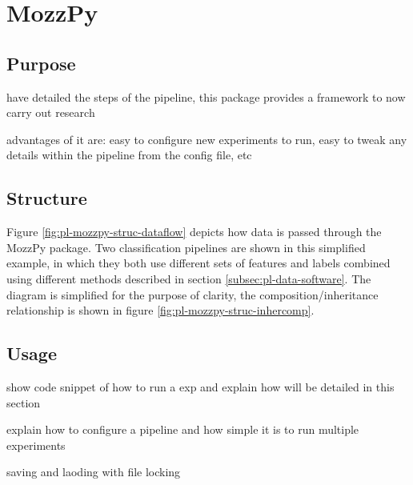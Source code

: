 \section{MozzPy}
\label{sec:pl-mozzpy}
    \subsection{Purpose}
    \label{subsec:pl-mozzpy-purp}
        \begin{sitemize}
            \item{have detailed the steps of the pipeline, this package provides a framework to now carry out research}
            \item{advantages of it are: easy to configure new experiments to run, easy to tweak any details within the pipeline from the config file, etc}
        \end{sitemize}
    
    \subsection{Structure}
    \label{subsec:pl-mozzpy-struc}
        
        Figure \ref{fig:pl-mozzpy-struc-dataflow} depicts how data is passed through the MozzPy package. Two classification pipelines are shown in this simplified example, in which they both use different sets of features and labels combined using different methods described in section \ref{subsec:pl-data-software}. The diagram is simplified for the purpose of clarity, the composition/inheritance relationship is shown in figure \ref{fig:pl-mozzpy-struc-inhercomp}.
        
        
        
  
        
    
    \subsection{Usage}
    \label{subsec:pl-mozzpy-usage}
        \begin{sitemize}
            \item{show code snippet of how to run a exp and explain how will be detailed in this section}
            \item{explain how to configure a pipeline and how simple it is to run multiple experiments}
            \item{saving and laoding with file locking}
        \end{sitemize}
   
